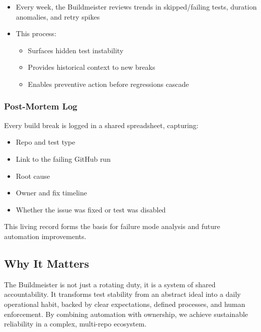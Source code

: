 \documentclass{article}
\begin{document}
\begin{itemize}

  \item Every week, the Buildmeister reviews trends in skipped/failing tests, duration
    anomalies, and retry spikes

  \item This process:

    \begin{itemize}

      \item Surfaces hidden test instability

      \item Provides historical context to new breaks

      \item Enables preventive action before regressions cascade
    \end{itemize}
\end{itemize}

\subsubsection{Post-Mortem Log}

Every build break is logged in a shared spreadsheet, capturing:

\begin{itemize}

  \item Repo and test type

  \item Link to the failing GitHub run

  \item Root cause

  \item Owner and fix timeline

  \item Whether the issue was fixed or test was disabled
\end{itemize}

This living record forms the basis for failure mode analysis and future automation
improvements.

\subsection{Why It Matters}

The Buildmeister is not just a rotating duty, it is a system of shared accountability.
It transforms test stability from an abstract ideal into a daily operational
habit, backed by clear expectations, defined processes, and human enforcement.
By combining automation with ownership, we achieve sustainable reliability in a complex,
multi-repo ecosystem.
\end{document}
